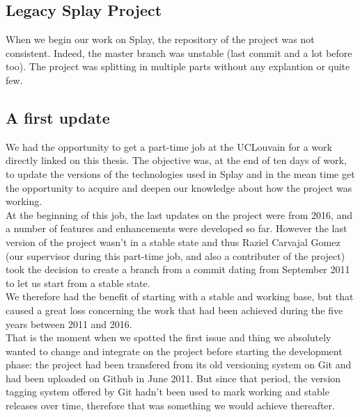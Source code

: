 \documentclass{eplmastersthesis}
\begin{document}
    \subsection{Legacy Splay Project}

      When we begin our work on Splay, the repository of the
      project \cite{SplayGit} was not consistent. Indeed, the master branch was
      unstable (last commit and a lot before too). The project was splitting in
      multiple parts without any explantion or quite few.

    \subsection{A first update}


      We had the opportunity to get a part-time job at the UCLouvain for
      a work directly linked on this thesis. The objective was, at the end
      of ten days of work, to update the versions of the technologies used
      in Splay and in the mean time get the opportunity to acquire and
      deepen our knowledge about how the project was working.\\

      At the beginning of this job, the last updates on the project were
      from 2016, and a number of features and enhancements were developed
      so far. However the last version of the project wasn't in a stable
      state and thus Raziel Carvajal Gomez (our supervisor during this
      part-time job, and also a contributer of the project) took the decision
      to create a branch from a commit dating from September 2011 to let us
      start from a stable state.\\
      We therefore had the benefit of starting with a stable and working
      base, but that caused a great loss concerning the work that had been
      achieved during the five years between 2011 and 2016.\\
      That is the moment when we spotted the first issue and thing we
      absolutely wanted to change and integrate on the project before
      starting the development phase: the project had been transfered from
      its old versioning system on Git and had been uploaded on Github in
      June 2011. But since that period, the version tagging system offered
      by Git hadn't been used to mark working and stable releases over time,
      therefore that was something we would achieve thereafter.\\
\end{document}
